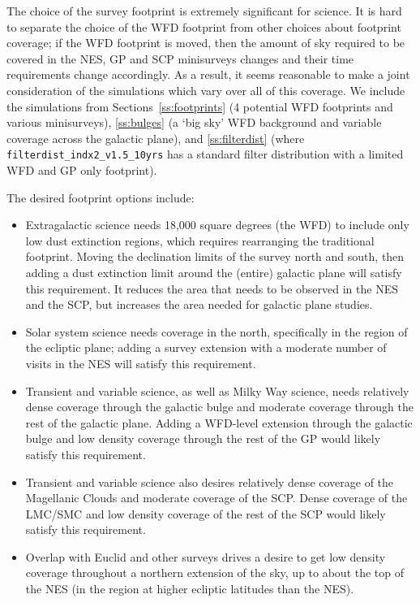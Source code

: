 The choice of the survey footprint is extremely significant for science. It is hard to separate the choice of the WFD footprint from other choices about footprint coverage; if the WFD footprint is moved, then the amount of sky required to be covered in the NES, GP and SCP minisurveys changes and their time requirements change accordingly. As a result, it seems reasonable to make a joint consideration of the simulations which vary over all of this coverage. We include the simulations from Sections~\ref{ss:footprints} (4 potential WFD footprints and various minisurveys),  \ref{ss:bulges} (a `big sky' WFD background and variable coverage across the galactic plane), and \ref{ss:filterdist} (where {\tt filterdist\_indx2\_v1.5\_10yrs} has a standard filter distribution with a limited WFD and GP only footprint). 

The desired footprint options include:
\begin{itemize}
\item Extragalactic science needs 18,000 square degrees (the WFD) to include only low dust extinction regions, which requires rearranging the traditional footprint. Moving the declination limits of the survey north and south, then adding a dust extinction limit around the (entire) galactic plane will satisfy this requirement. It reduces the area that needs to be observed in the NES and the SCP, but increases the area needed for galactic plane studies. 
\item Solar system science needs coverage in the north, specifically in the region of the ecliptic plane; adding a survey extension with a moderate number of visits in the NES will satisfy this requirement. 
\item Transient and variable science, as well as Milky Way science, needs relatively dense coverage through the galactic bulge and moderate coverage through the rest of the galactic plane. Adding a WFD-level extension through the galactic bulge and low density coverage through the rest of the GP would likely satisfy this requirement.
\item Transient and variable science also desires relatively dense coverage of the Magellanic Clouds and moderate coverage of the SCP. Dense coverage of the LMC/SMC and low density coverage of the rest of the SCP would likely satisfy this requirement.
\item Overlap with Euclid and other surveys drives a desire to get low density coverage throughout a northern extension of the sky, up to about the top of the NES (in the region at higher ecliptic latitudes than the NES).
\end{itemize}

